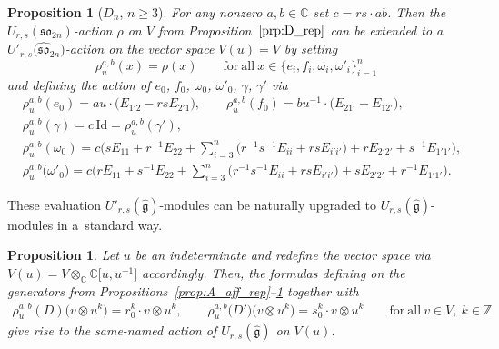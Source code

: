\documentclass[pdftex]{sigma}
\numberwithin{equation}{section}
\newtheorem{Proposition}[Theorem]{Proposition}
 { \theoremstyle{definition}
\newtheorem{Definition}[Theorem]{Definition}
\newtheorem{Note}[Theorem]{Note}
\newtheorem{Example}[Theorem]{Example}
\newtheorem{Remark}[Theorem]{Remark} }
\newcommand{\fg}{\mathfrak{g}}
\newcommand{\BZ}{\mathbb{Z}}
\newcommand{\BC}{\mathbb{C}}
\newcommand{\sso}{\mathfrak{so}}
\newcommand{\UU}{U_{r,s}(\widehat{\fg})}
\newcommand{\Uu}{U'_{r,s}(\widehat{\fg})}
\newcommand{\Id}{\mathrm{Id}}
\begin{document}
\begin{Proposition}[$D_n$, $n\geq 3$]\label{prop:D_aff_rep}
For any nonzero $a,b\in \BC$ set $c=rs\cdot ab$. Then the $U_{r,s}(\sso_{2n})$-action $\rho$ on $V$ from Proposition~$\ref{prp:D_rep}$ can be extended to a $U'_{r,s}\bigl(\widehat{\sso}_{2n}\bigr)$-action  on the vector space $V(u)=V$ by setting
\begin{displaymath}
 \rho^{a,b}_u(x)=\rho(x) \qquad \mathrm{for\ all} \ x\in \bigl\{e_i,f_i,\omega_i,\omega'_i\bigr\}_{i=1}^{n}
\end{displaymath}
and defining the action of $e_0$, $f_0$, $\omega_0$, $\omega'_0$, $\gamma$, $\gamma'$ via
\begin{displaymath}
\begin{split}
 & \rho^{a,b}_u(e_0)=au \cdot \bigl(E_{1' 2} - rs E_{2' 1} \bigr), \qquad
 \rho^{a,b}_u(f_0)=bu^{-1} \cdot \bigl(E_{2 1'}-E_{1 2'}), \\
 &\rho^{a,b}_u(\gamma)=c \, \Id=\rho^{a,b}_u(\gamma') , \\
 & \rho^{a,b}_u(\omega_0)=
 c\Biggl( sE_{11}+r^{-1}E_{22}+\sum_{i=3}^{n} \bigl( r^{-1}s^{-1}E_{ii} + rs E_{i'i'}\bigr) +
 rE_{2' 2'} + s^{-1}E_{1' 1'} \Biggr), \\
 & \rho^{a,b}_u\big(\omega'_0\big)=
 c\Biggl( rE_{11}+s^{-1}E_{22}+\sum_{i=3}^{n} \bigl( r^{-1}s^{-1}E_{ii} + rs E_{i'i'}\bigr) +
 sE_{2' 2'} + r^{-1}E_{1' 1'} \Biggr).
\end{split}
\end{displaymath}
\end{Proposition}

These evaluation $\Uu$-modules  can be naturally upgraded to $\UU$-modules in a~standard way.

\begin{Proposition}\label{prop:affine-actions-withD}
Let $u$ be an indeterminate and redefine the vector space via $V(u)=V\otimes_\BC \BC\big[u,u^{-1}\big]$ accordingly. Then, the formulas defining  on the generators from Propositions~{\rm \ref{prop:A_aff_rep}--\ref{prop:D_aff_rep}} together with
\begin{gather*}
 \rho^{a,b}_u(D) \bigl(v\otimes u^k\bigr) = r_0^k \cdot v\otimes u^k , \qquad
 \rho^{a,b}_u\bigl(D'\bigr) \bigl(v\otimes u^k\bigr) = s_0^k \cdot v\otimes u^k \qquad
 \mathrm{for\ all} \ v\in V,\ k\in \BZ
\end{gather*}
give rise to the same-named action  of $\UU$ on $V(u)$.
\end{Proposition}
\end{document}
